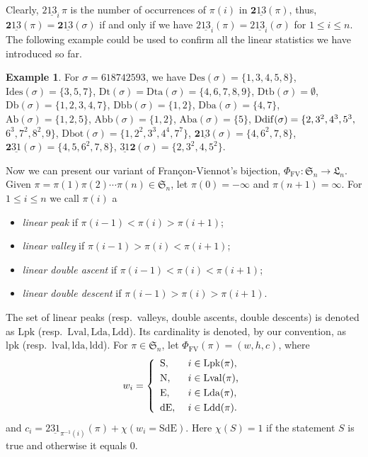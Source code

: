 \documentclass[12pt]{amsart}
\numberwithin{equation}{section}
\theoremstyle{plain}
\theoremstyle{definition}
\newtheorem{example}[theorem]{Example}
\def\FV{\mathrm{FV}}
\def\SS{\mathfrak{S}}
\def\LH{\mathfrak{L}}
\def\N{\mathrm{N}}
\def\S{\mathrm{S}}
\def\E{\mathrm{E}}
\def\dE{\mathrm{dE}}
\def\SdE{\mathrm{SdE}}
\def\Des{\mathrm{Des}}
\def\Db{\mathrm{Db}}
\def\Ab{\mathrm{Ab}}
\def\Id{\mathrm{Ides}}
\def\Dt{\mathrm{Dt}}
\def\Ddif{\mathrm{Ddif}}
\def\Dbot{\mathrm{Dbot}}
\def\Dtb{\mathrm{Dtb}}
\def\Dta{\mathrm{Dta}}
\def\Dbb{\mathrm{Dbb}}
\def\Dba{\mathrm{Dba}}
\def\Abb{\mathrm{Abb}}
\def\Aba{\mathrm{Aba}}
\def\Lpk{\mathrm{Lpk}}
\def\Lval{\mathrm{Lval}}
\def\Lda{\mathrm{Lda}}
\def\Ldd{\mathrm{Ldd}}
\def\lpk{\mathrm{lpk}}
\def\lval{\mathrm{lval}}
\def\lda{\mathrm{lda}}
\def\ldd{\mathrm{ldd}}
\def\pprs{\mathrm{2\underline{13}}}
\def\ppwrs{\mathrm{2\underline{31}}}
\def\rightascent{{\mathbf{2}\underline{13}}}
\def\leftdescent{\mathrm{\underline{31}}\mathbf{2}}
\def\rightdescent{\mathrm{\mathbf{2}\underline{31}}}
\begin{document}
Clearly, $\pprs_i\, \pi$ is the number of occurrences of $\pi(i)$ in $\rightascent(\pi)$, thus, $\rightascent(\pi) =\rightascent(\sigma)$ if and only if we have
$\pprs_i(\pi)=\pprs_i(\sigma)$ for $1 \leq i \leq n$. The following example could be used to confirm all the linear statistics we have introduced so far.


\begin{example}
For $\sigma=618742593$, we have
$\Des(\sigma)=\{1,3,4,5,8\}$,
$\Id(\sigma)=\{3,5,7\}$,
$\Dt(\sigma)=\Dta(\sigma)=\{4,6,7,8,9\}$,
$\Dtb(\sigma)=\emptyset$,
$\Db(\sigma)=\{1,2,3,4,7\}$,
$\Dbb(\sigma)=\{1,2\}$,
$\Dba(\sigma)=\{4,7\}$,
$\Ab(\sigma)=\{1,2,5\}$,
$\Abb(\sigma)=\{1,2\}$,
$\Aba(\sigma)=\{5\}$,
$\Ddif(\sigma)=\{2,3^2,4^3,5^3,\linebreak$
$6^3,7^2,8^2,9\}$,
$\Dbot(\sigma)=\{1,2^2,3^3,4^4,7^7\}$,
$\rightascent(\sigma)=\{4,6^2,7,8\}$,
$\rightdescent(\sigma)=\{4,5,6^2,7,8\}$,
$\leftdescent(\sigma)=\{2,3^2,4,5^2\}$.
\end{example}

Now we can present our variant of Fran\c con-Viennot's bijection, $\Phi_{\FV}: \SS_n \to \LH_n$.
Given $\pi=\pi(1)\pi(2) \cdots \pi(n) \in \SS_n$, let $\pi(0)=-\infty$ and
$\pi(n+1)=\infty$. For $1 \leq i \leq n$ we call $\pi(i)$ a
\begin{itemize}
  \item {\em linear peak} if $\pi(i-1) < \pi(i) >\pi(i+1)$;
  \item {\em linear valley} if $\pi(i-1) > \pi(i) < \pi(i+1)$;
  \item {\em linear double ascent} if $\pi(i-1) < \pi(i) <\pi(i+1)$;
  \item {\em linear double descent} if $\pi(i-1) > \pi(i) >\pi(i+1)$.
\end{itemize}
The set of linear peaks (resp.~valleys, double ascents, double descents) is denoted as $\Lpk$ (resp.~$\Lval, \Lda, \Ldd$). Its cardinality is denoted, by our convention, as $\lpk$ (resp.~$\lval, \lda, \ldd$). For $\pi \in \SS_n$, let $\Phi_{\FV}(\pi)=(w,h,c)$, where
\begin{equation*}
w_i= \left\{
  \begin{array}{ll}
  \S, & \mbox{  $ i \in \Lpk(\pi)$,} \\[3pt]
  \N, & \mbox{ $ i \in \Lval(\pi)$,}\\[3pt]
  \E, & \mbox{  $ i \in \Lda(\pi)$,}\\[3pt]
  \dE, & \mbox{  $ i \in \Ldd(\pi)$.}
 \end{array} \right.
\end{equation*}
and $c_{i}=\ppwrs_{\pi^{-1}(i)}(\pi)+\chi(w_{i}=\SdE)$. Here $\chi(S)=1$ if the statement $S$ is true and otherwise it equals $0$.
\end{document}
